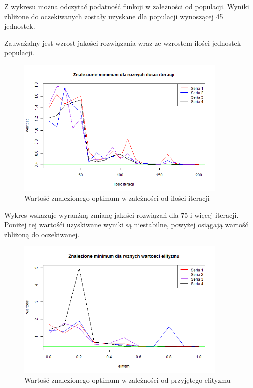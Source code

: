 \documentclass[11pt, a4paper]{article}
\newcommand{\fbi}{\leavevmode{\parindent=1em\indent}}
\begin{document}
\fbi
Z wykresu można odczytać podatność funkcji w zależności od populacji. Wyniki zbliżone do oczekiwanych zostały uzyskane dla populacji wynoszącej 45 jednostek.

\fbi
Zauważalny jest wzrost jakości rozwiązania wraz ze wzrostem ilości jednostek populacji.


\begin{figure}[H]
	\centering
	\includegraphics[width=0.9\textwidth]{./assets/Branin5.png} %
	\caption{Wartość znalezionego optimum w zależności od ilości iteracji}
	\label{fig:branin5}
\end{figure}

\fbi
Wykres wskazuje wyranźną zmianę jakości rozwiązań dla 75 i więcej iteracji. Poniżej tej wartośći uzyskiwane wyniki są niestabilne, powyżej osiągają wartość zbliżoną do oczekiwanej.

\begin{figure}[H]
	\centering
	\includegraphics[width=0.9\textwidth]{./assets/Branin6.png} %
	\caption{Wartość znalezionego optimum w zależności od przyjętego elityzmu}
	\label{fig:branin6}
\end{figure}
\end{document}
